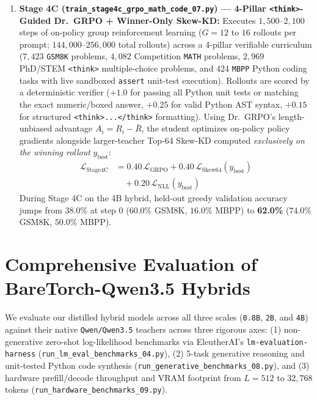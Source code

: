 \documentclass[twocolumn,10pt]{article}
\begin{document}
\begin{enumerate}
    \item \textbf{Stage 4C (\texttt{train\_stage4c\_grpo\_math\_code\_07.py}) --- 4-Pillar \texttt{<think>}-Guided Dr.\ GRPO + Winner-Only Skew-KD:}
    Executes $1,500$--$2,100$ steps of on-policy group reinforcement learning ($G=12$ to $16$ rollouts per prompt; $144,000$--$256,000$ total rollouts) across a 4-pillar verifiable curriculum ($7,423$ \texttt{GSM8K} problems, $4,082$ Competition \texttt{MATH} problems, $2,969$ PhD/STEM \texttt{<think>} multiple-choice problems, and $424$ \texttt{MBPP} Python coding tasks with live sandboxed \texttt{assert} unit-test execution). Rollouts are scored by a deterministic verifier ($+1.0$ for passing all Python unit tests or matching the exact numeric/boxed answer, $+0.25$ for valid Python AST syntax, $+0.15$ for structured \texttt{<think>...</think>} formatting). Using Dr.\ GRPO's length-unbiased advantage $A_i = R_i - \bar{R}$, the student optimizes on-policy policy gradients alongside larger-teacher Top-64 Skew-KD computed \textit{exclusively on the winning rollout} $y_{\text{best}}$:
    \begin{align}
    \mathcal{L}_{\text{Stage4C}} &= 0.40 \, \mathcal{L}_{\text{GRPO}} + 0.40 \, \mathcal{L}_{\text{Skew64}}(y_{\text{best}}) \nonumber \\
    &\quad + 0.20 \, \mathcal{L}_{\text{NLL}}(y_{\text{best}})
    \end{align}
    During Stage 4C on the 4B hybrid, held-out greedy validation accuracy jumps from $38.0\%$ at step 0 ($60.0\%$ GSM8K, $16.0\%$ MBPP) to \textbf{62.0\%} ($74.0\%$ GSM8K, $50.0\%$ MBPP).
\end{enumerate}

\section{Comprehensive Evaluation of BareTorch-Qwen3.5 Hybrids}
We evaluate our distilled hybrid models across all three scales (\texttt{0.8B}, \texttt{2B}, and \texttt{4B}) against their native \texttt{Qwen/Qwen3.5} teachers across three rigorous axes: (1) non-generative zero-shot log-likelihood benchmarks via EleutherAI's \texttt{lm-evaluation-harness} (\texttt{run\_lm\_eval\_benchmarks\_04.py}), (2) 5-task generative reasoning and unit-tested Python code synthesis (\texttt{run\_generative\_benchmarks\_08.py}), and (3) hardware prefill/decode throughput and VRAM footprint from $L=512$ to $32,768$ tokens (\texttt{run\_hardware\_benchmarks\_09.py}).
\end{document}
